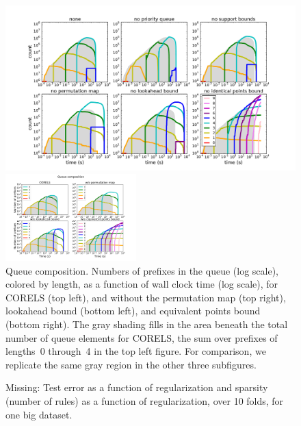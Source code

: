 \begin{figure}[t!]
\begin{center}
\begin{arxiv}
\includegraphics[width=\textwidth]{figs/ela_compas_compare-queue.pdf}
\end{arxiv}
\begin{kdd}
\includegraphics[trim={30mm 15mm 35mm 20mm}, width=0.45\textwidth]{figs/kdd_compas_compare_small-queue.pdf}
\end{kdd}
\end{center}
\caption{Queue composition. %
%
Numbers of prefixes in the queue (log scale), colored by length,
as a function of wall clock time (log scale),
for CORELS (top left), and without the permutation map (top right),
lookahead bound (bottom left), and equivalent points bound (bottom right).
%
The gray shading fills in the area beneath the total number of
queue elements for CORELS, \ie the sum over prefixes of lengths~0
through~4 in the top left figure.
%
For comparison, we replicate the same gray region
in the other three subfigures.
}
\label{fig:queue}
\end{figure}

\begin{arxiv}
\begin{figure}[t!]
\begin{center}
\end{center}
\caption{Missing:  Test error as a function of regularization and sparsity
(number of rules) as a function of regularization, over 10 folds,
for one big dataset.}
\label{fig:regularization}
\end{figure}
\end{arxiv}

